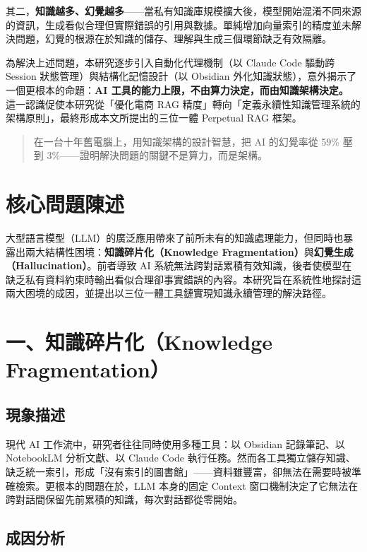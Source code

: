 其二，\textbf{知識越多、幻覺越多}------當私有知識庫規模擴大後，模型開始混淆不同來源的資訊，生成看似合理但實際錯誤的引用與數據。單純增加向量索引的精度並未解決問題，幻覺的根源在於知識的儲存、理解與生成三個環節缺乏有效隔離。

為解決上述問題，本研究逐步引入自動化代理機制（以 Claude Code 驅動跨
Session 狀態管理）與結構化記憶設計（以 Obsidian
外化知識狀態），意外揭示了一個更根本的命題：\textbf{AI
工具的能力上限，不由算力決定，而由知識架構決定。}
這一認識促使本研究從「優化電商 RAG
精度」轉向「定義永續性知識管理系統的架構原則」，最終形成本文所提出的三位一體
Perpetual RAG 框架。

\begin{quote}
在一台十年舊電腦上，用知識架構的設計智慧，把 AI 的幻覺率從 59\% 壓到
3\%------證明解決問題的關鍵不是算力，而是架構。
\end{quote}

\section{核心問題陳述}\label{ux6838ux5fc3ux554fux984cux9673ux8ff0}

大型語言模型（LLM）的廣泛應用帶來了前所未有的知識處理能力，但同時也暴露出兩大結構性困境：\textbf{知識碎片化（Knowledge
Fragmentation）}與\textbf{幻覺生成（Hallucination）}。前者導致 AI
系統無法跨對話累積有效知識，後者使模型在缺乏私有資料約束時輸出看似合理卻事實錯誤的內容。本研究旨在系統性地探討這兩大困境的成因，並提出以三位一體工具鏈實現知識永續管理的解決路徑。

\section{一、知識碎片化（Knowledge
Fragmentation）}\label{ux4e00ux77e5ux8b58ux788eux7247ux5316knowledge-fragmentation}

\subsection{現象描述}\label{ux73feux8c61ux63cfux8ff0}

現代 AI 工作流中，研究者往往同時使用多種工具：以 Obsidian 記錄筆記、以
NotebookLM 分析文獻、以 Claude Code
執行任務。然而各工具獨立儲存知識、缺乏統一索引，形成「沒有索引的圖書館」------資料雖豐富，卻無法在需要時被準確檢索。更根本的問題在於，LLM
本身的固定 Context
窗口機制決定了它無法在跨對話間保留先前累積的知識，每次對話都從零開始。

\subsection{成因分析}\label{ux6210ux56e0ux5206ux6790}

